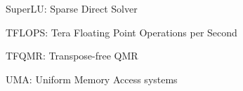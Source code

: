 SuperLU: Sparse Direct Solver

TFLOPS: Tera Floating Point Operations per Second

TFQMR: Transpose-free QMR

UMA: Uniform Memory Access systems












































